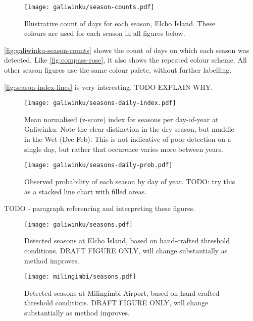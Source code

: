 \begin{figure}
    \centering
    \texttt{[image: galiwinku/season-counts.pdf]}
    \caption[Calculated season frequency, Elcho Island]{
        Illustrative count of days for each season, Elcho Island.
        These colours are used for each season in all figures below.
        }
    \label{fig:galiwinku-season-counts}
\end{figure}

\autoref{fig:galiwinku-season-counts} shows the count of days on which
each season was detected.  Like \autoref{fig:compass-rose}, it also
shows the repeated colour scheme.  All other season figures use the
same colour palete, without further labelling.

\autoref{fig:season-index-lines} is very interesting.  TODO EXPLAIN WHY.

\begin{figure}[h]
    \centering
    \texttt{[image: galiwinku/seasons-daily-index.pdf]}
    \caption[Season index by day-of-year, Elcho Island]{
        Mean normalised (z-score) index for seasons per day-of-year
        at Galiwinku.  Note the clear distinction in the dry season,
        but muddle in the Wet (Dec-Feb).
        This is not indicative of poor detection on a single day,
        but rather that occurence varies more between years.
        }
    \label{fig:season-daily-lines}
\end{figure}


\begin{figure}[h]
    \centering
    \texttt{[image: galiwinku/seasons-daily-prob.pdf]}
    \caption[Season probability by day-of-year, Elcho Island]{
        Observed probability of each season by day of year.
        TODO: try this as a stacked line chart with filled areas.
        }
    \label{fig:season-daily-prob}
\end{figure}




TODO - paragraph referencing and interpreting these figures.

\begin{figure}[p]
    \centering
    \texttt{[image: galiwinku/seasons.pdf]}
    \caption[Detected seasons for Elcho Island]{
        Detected seasons at Elcho Island, based on hand-crafted threshold conditions.
        DRAFT FIGURE ONLY, will change substantially as method improves.
        }
    \label{fig:galiwinku-seasons}
\end{figure}
\begin{figure}[p]
    \centering
    \texttt{[image: milingimbi/seasons.pdf]}
    \caption[Detected seasons for Milingimbi Airport]{
        Detected seasons at Milingimbi Airport, based on hand-crafted threshold conditions.
        DRAFT FIGURE ONLY, will change substantially as method improves.
        }
    \label{fig:milingimbi-seasons}
\end{figure}



